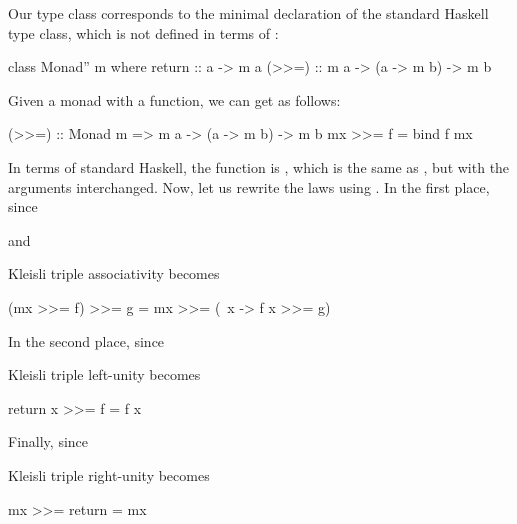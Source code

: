 \begin{remark}
  \label{re:triple-standard}

  Our  type class corresponds to the minimal
  declaration of the standard Haskell  type class,
  which is not defined in terms of :
  \begin{codehaskell}
class Monad'' m where
  return :: a -> m a
  (>>=)  :: m a -> (a -> m b) -> m b
  \end{codehaskell}
  Given a monad with a  function, we can get
  \texthaskell{(>>=)} as follows:
  \begin{codehaskell}
(>>=) :: Monad m => m a -> (a -> m b) -> m b
mx >>= f = bind f mx
  \end{codehaskell}
  In terms of standard Haskell, the  function is
  \texthaskell{(<<=)}, which is the same as \texthaskell{(>>=)}, but
  with the arguments interchanged. Now, let us rewrite the
   laws using \texthaskell{(>>=)}. In the first
  place, since
  \begin{steps}
      \eqbydefh{(>>=)}
      \eqbydefh{(>>=)}
  \end{steps}
  and
  \begin{steps}
      \eqbydefh{(>>=)}
      \eqbydefh{(>>=)}
  \end{steps}
  Kleisli triple associativity becomes
  \begin{codehaskell}
(mx >>= f) >>= g = mx >>= (\ x -> f x >>= g)
  \end{codehaskell}
  In the second place, since
  \begin{steps}
      \eqbydefh{(>>=)}
  \end{steps}
  Kleisli triple left-unity becomes
  \begin{codehaskell}
return x >>= f = f x
  \end{codehaskell}
  Finally, since
  \begin{steps}
      \eqbydefh{(>>=)}
  \end{steps}
  Kleisli triple right-unity becomes
  \begin{codehaskell}
mx >>= return = mx
  \end{codehaskell}

\end{remark}

